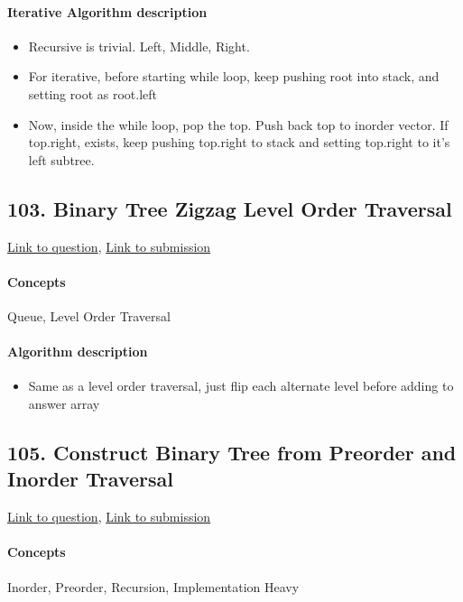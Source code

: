 \documentclass[11pt]{book}
\begin{document}
\paragraph{Iterative Algorithm description}
\begin{itemize}
    \item Recursive is trivial. Left, Middle, Right.
    \item For iterative, before starting while loop, keep pushing root into stack, and setting root as root.left
    \item Now, inside the while loop, pop the top. Push back top to inorder vector. If top.right, exists, keep pushing top.right to stack and setting top.right to it's left subtree.
\end{itemize}

\subsection{103. Binary Tree Zigzag Level Order Traversal}
\href{https://leetcode.com/problems/binary-tree-zigzag-level-order-traversal/}{Link to question},
\href{https://leetcode.com/submissions/detail/338220725/}{Link to submission}
\paragraph{Concepts}
Queue, Level Order Traversal
\paragraph{Algorithm description}
\begin{itemize}
    \item Same as a level order traversal, just flip each alternate level before adding to answer array
\end{itemize}

\subsection{105. Construct Binary Tree from Preorder and Inorder Traversal}
\href{https://leetcode.com/problems/construct-binary-tree-from-preorder-and-inorder-traversal/}{Link to question},
\href{https://leetcode.com/submissions/detail/338231098/}{Link to submission}
\paragraph{Concepts}
Inorder, Preorder, Recursion, Implementation Heavy
\end{document}
